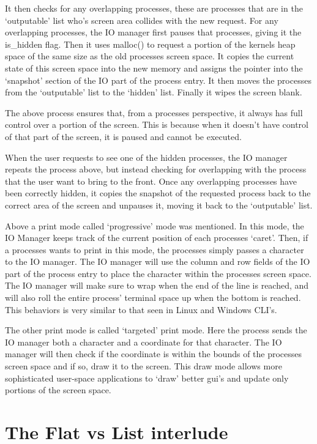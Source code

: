 \documentclass[a4paper]{report}
\begin{document}
It then checks for any overlapping processes, these are processes that are in the `outputable' list who's screen area collides with the new request. For any overlapping processes, the IO manager first pauses that processes, giving it the is\_hidden flag. Then it uses malloc() to request a portion of the kernels heap space of the same size as the old processes screen space. It copies the current state of this screen space into the new memory and assigns the pointer into the `snapshot' section of the IO part of the process entry. It then moves the processes from the `outputable' list to the `hidden' list. Finally it wipes the screen blank.

The above process ensures that, from a processes perspective, it always has full control over a portion of the screen. This is because when it doesn't have control of that part of the screen, it is paused and cannot be executed.

When the user requests to see one of the hidden processes, the IO manager repeats the process above, but instead checking for overlapping with the process that the user want to bring to the front. Once any overlapping processes have been correctly hidden, it copies the snapshot of the requested process back to the correct area of the screen and unpauses it, moving it back to the `outputable' list.

Above a print mode called `progressive' mode was mentioned. In this mode, the  IO Manager keeps track of the current position of each processes `caret'. Then, if a processes wants to print in this mode, the processes simply passes a character to the IO manager. The IO manager will use the column and row fields of the IO part of the process entry to place the character within the processes screen space. The IO manager will make sure to wrap when the end of the line is reached, and will also roll the entire process' terminal space up when the bottom is reached. This behaviors is very similar to that seen in Linux and Windows CLI's.

The other print mode is called `targeted' print mode. Here the process sends the IO manager both a character and a coordinate for that character. The IO manager will then check if the coordinate is within the bounds of the processes screen space and if so, draw it to the screen. This draw mode allows more sophisticated user-space applications to `draw' better gui's and update only portions of the screen space.

\section{The Flat vs List interlude}
\end{document}
